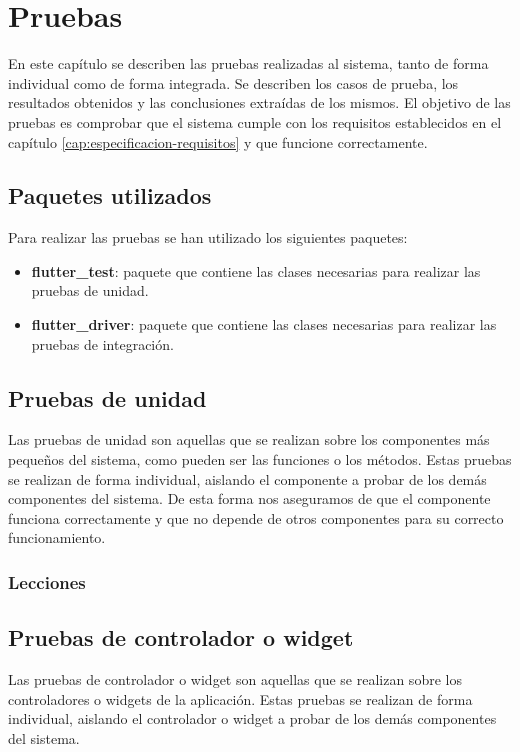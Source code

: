 \chapter{Pruebas}
\label{cap:pruebas}
En este capítulo se describen las pruebas realizadas al sistema, tanto de forma individual como de forma integrada. Se describen los casos de prueba, los resultados obtenidos y las conclusiones extraídas de los mismos.
El objetivo de las pruebas es comprobar que el sistema cumple con los requisitos establecidos en el capítulo \ref{cap:especificacion-requisitos} y que funcione correctamente.

\section{Paquetes utilizados}
\label{sec:paquetes-utilizados}
Para realizar las pruebas se han utilizado los siguientes paquetes:

\begin{itemize}
    \item \textbf{flutter\_test}: paquete que contiene las clases necesarias para realizar las pruebas de unidad.
    \item \textbf{flutter\_driver}: paquete que contiene las clases necesarias para realizar las pruebas de integración.
\end{itemize}

\section{Pruebas de unidad}
\label{sec:pruebas-unidad}
Las pruebas de unidad son aquellas que se realizan sobre los componentes más pequeños del sistema, como pueden ser las funciones o los métodos. Estas pruebas se realizan de forma individual, aislando el componente a probar de los demás componentes del sistema. 
De esta forma nos aseguramos de que el componente funciona correctamente y que no depende de otros componentes para su correcto funcionamiento.

\subsection{Lecciones}
\label{subsec:pruebas-unidad-lecciones}




\section*{Pruebas de controlador o widget}
\label{sec:pruebas-controlador}
Las pruebas de controlador o widget son aquellas que se realizan sobre los controladores o widgets de la aplicación. Estas pruebas se realizan de forma individual, aislando el controlador o widget a probar de los demás componentes del sistema.


